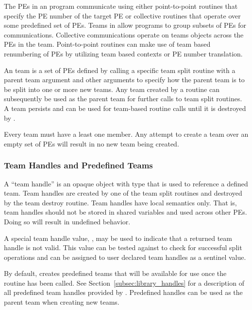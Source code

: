 The \acp{PE} in an \openshmem program communicate using either
point-to-point routines that specify the \ac{PE} number of the target
\ac{PE} or collective routines that operate over some predefined
set of \acp{PE}. Teams in \openshmem allow programs to group subsets
of \acp{PE} for communications. Collective communications operate on
teams objects across the \acp{PE} in the team. Point-to-point routines
can make use of team based renumbering of \acp{PE} by utilizing team
based contexts or \ac{PE} number translation.

An \openshmem team is a set of \acp{PE} defined by calling a specific team
split routine with a parent team argument and other arguments to
specify how the parent team is to be split into one or more new teams.
Any team created by a  routine can subsequently
be used as the parent team for further calls to team split routines.
A team persists and can be used for team-based routine calls
until it is destroyed by .

Every team must have a least one member. Any attempt to create a team over an
empty set of \acp{PE} will result in no new team being created.

\subsubsection*{Team Handles and Predefined Teams}

A ``team handle'' is an opaque object with type  that is used
to reference a defined team.  Team handles are created by one of the team split
routines and destroyed by the team destroy routine. Team handles have local
semantics only. That is, team handles should not be stored in shared variables
and used across other \acp{PE}. Doing so will result in undefined behavior.

A special team handle value, , may be used to
indicate that a returned team handle is not valid. This value can be tested
against to check for successful split operations and can be assigned to user
declared team handles as a sentinel value.

By default, \openshmem creates predefined teams that will be available
for use once the routine  has been called. See
Section~\ref{subsec:library_handles} for a description of all predefined team handles
provided by \openshmem. Predefined  handles can be used as
the parent team when creating new \openshmem teams.

